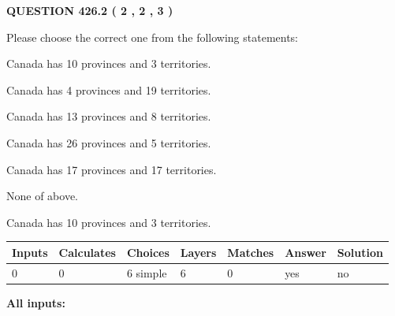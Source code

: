 \documentclass[12pt]{article}
\begin{document}
   
  
\vspace{0.2in}
  
{\textbf{\Large{QUESTION
426.2 
 ( 2 , 2 , 3 )
}}}
  
  
Please choose the correct one from the following statements:
 
 
Canada has 10  provinces and 3 territories.
 
 
Canada has   4 provinces and  19 territories.
 
 
Canada has  13 provinces and  8 territories.
 
 
Canada has  26 provinces and  5 territories.
 
 
Canada has  17 provinces and  17 territories.
 
 
 None of above.
 
 
\noindent{}
 
 
Canada has 10  provinces and 3 territories.
 
 
\noindent{}
 
 
   
   
   
   
\noindent\begin{tabular}{|l|l|l|l|l|l|l|}
 \hline
Inputs & Calculates & Choices & Layers & Matches & Answer & Solution \\ \hline
 0  & 
 0  & 
 6
  simple  
  & 
 6  & 
 0  & 
  yes & 
  no 
  \\ \hline
 \end{tabular}
   
   
   
   
\noindent{}
   
   
   
   
\noindent\vspace{0.1in}\hspace{-0.08in} {\textbf{\Large{All inputs: }}}
   
   
   
   
   
   
 \vspace{0.2in}
 
\end{document}
